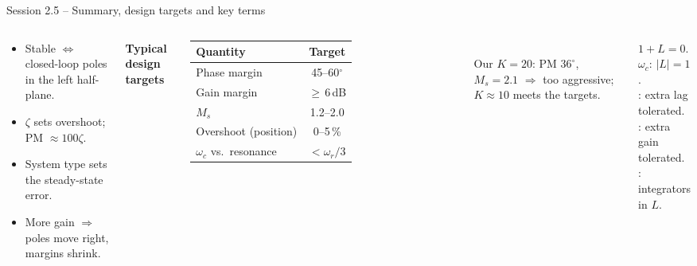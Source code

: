 \documentclass[aspectratio=169,10pt]{beamer}
\begin{document}
\begin{frame}{Session 2.5 -- Summary, design targets and key terms}
\begin{columns}[T]
\begin{keybox}
\footnotesize
\begin{itemize}
  \item Stable $\iff$ closed-loop poles in the left half-plane.
  \item $\zeta$ sets overshoot; PM $\approx100\zeta$.
  \item System type sets the steady-state error.
  \item More gain $\Rightarrow$ poles move right, margins shrink.
\end{itemize}
\end{keybox}
\footnotesize
\textbf{Typical design targets}\\[2pt]
\begin{tabular}{@{}lc@{}}
\toprule
Quantity & Target\\
\midrule
Phase margin & 45--60$^\circ$\\
Gain margin & $\ge$\,6\,dB\\
$M_s$ & 1.2--2.0\\
Overshoot (position) & 0--5\,\%\\
$\omega_c$ vs.\ resonance & $<\omega_r/3$\\
\bottomrule
\end{tabular}\\[3pt]
Our $K=20$: PM $36^\circ$, $M_s=2.1$ $\Rightarrow$ too aggressive; $K\approx10$ meets the targets.
\begin{defbox}
\footnotesize
{} $1+L=0$.\\
 $\omega_c$: $|L|=1$.\\
: extra lag tolerated.\\
: extra gain tolerated.\\
: integrators in $L$.
\end{defbox}
\end{columns}
\end{frame}

\end{document}
